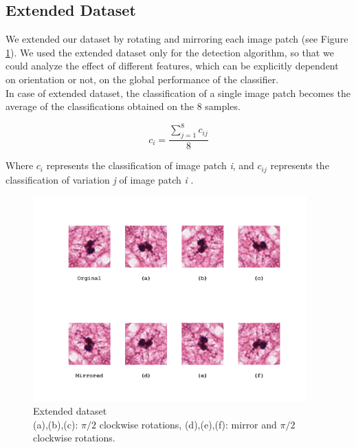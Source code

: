 \vspace{0.5cm}

\subsection{Extended Dataset}
\label{ch4:ed}

We extended our dataset by rotating and mirroring each image patch (see Figure \ref{ch4:fig1}). We used the extended dataset only for the detection algorithm, so that we could analyze
the effect of different features, which can be explicitly dependent on orientation or not, on the global performance of the classifier.\\
In case of extended dataset, the classification of a single image patch becomes the average of the classifications obtained on the 8 samples.

\begin{equation}
 c_{i} = \frac{\sum_{j=1}^{8} c_{ij}}{8}
\end{equation}

Where $c_{i}$ represents the classification of image patch \textit{i}, and $c_{ij}$ represents the classification of variation \textit{j} of image patch \textit{i} .



\begin{figure}[!hbt]
  \centering
    \includegraphics[width=0.94\textwidth]{./images/rotDataset.png}
  \caption[Extended Dataset]{Extended dataset\\(a),(b),(c): $\pi/2$ clockwise rotations, (d),(e),(f): mirror and $\pi/2$ clockwise rotations.}
  \label{ch4:fig1}
\end{figure}  

